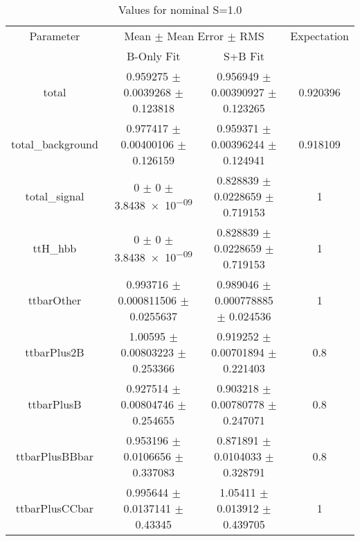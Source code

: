 \begin{table}
\centering
\caption{Values for nominal S=1.0}
\begin{tabular}{cccc}
\toprule
Parameter & \multicolumn{2}{c}{Mean $\pm$ Mean Error $\pm$ RMS} & Expectation\\
 & B-Only Fit & S+B Fit & \\
\midrule
total & \num{0.959275} $\pm$ \num{0.0039268} $\pm$ \num{0.123818} & \num{0.956949} $\pm$ \num{0.00390927} $\pm$ \num{0.123265} & \num{0.920396}\\
total\_background & \num{0.977417} $\pm$ \num{0.00400106} $\pm$ \num{0.126159} & \num{0.959371} $\pm$ \num{0.00396244} $\pm$ \num{0.124941} & \num{0.918109}\\
total\_signal & \num{0} $\pm$ \num{0} $\pm$ \num{3.8438e-09} & \num{0.828839} $\pm$ \num{0.0228659} $\pm$ \num{0.719153} & \num{1}\\
ttH\_hbb & \num{0} $\pm$ \num{0} $\pm$ \num{3.8438e-09} & \num{0.828839} $\pm$ \num{0.0228659} $\pm$ \num{0.719153} & \num{1}\\
ttbarOther & \num{0.993716} $\pm$ \num{0.000811506} $\pm$ \num{0.0255637} & \num{0.989046} $\pm$ \num{0.000778885} $\pm$ \num{0.024536} & \num{1}\\
ttbarPlus2B & \num{1.00595} $\pm$ \num{0.00803223} $\pm$ \num{0.253366} & \num{0.919252} $\pm$ \num{0.00701894} $\pm$ \num{0.221403} & \num{0.8}\\
ttbarPlusB & \num{0.927514} $\pm$ \num{0.00804746} $\pm$ \num{0.254655} & \num{0.903218} $\pm$ \num{0.00780778} $\pm$ \num{0.247071} & \num{0.8}\\
ttbarPlusBBbar & \num{0.953196} $\pm$ \num{0.0106656} $\pm$ \num{0.337083} & \num{0.871891} $\pm$ \num{0.0104033} $\pm$ \num{0.328791} & \num{0.8}\\
ttbarPlusCCbar & \num{0.995644} $\pm$ \num{0.0137141} $\pm$ \num{0.43345} & \num{1.05411} $\pm$ \num{0.013912} $\pm$ \num{0.439705} & \num{1}\\
\bottomrule
\end{tabular}
\end{table}